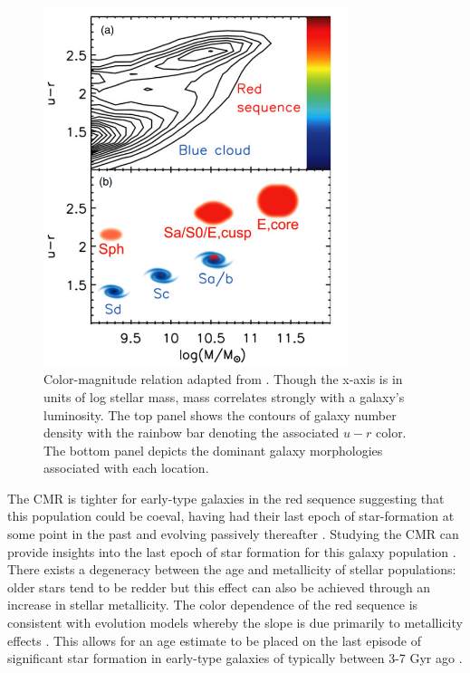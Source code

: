 \begin{figure}
\centering
\includegraphics[width=3.5in]{Figures/kormendy_CMR.png}
\caption[Galaxy color-magnitude relation.]{Color-magnitude relation adapted from \cite{Kormendy2012}. Though the x-axis is in units of log stellar mass, mass correlates strongly with a galaxy's luminosity. The top panel shows the contours of galaxy number density \citep{Baldry2004b} with the rainbow bar denoting the associated $u-r$ color. The bottom panel depicts the dominant galaxy morphologies associated with each location.}
\label{fig: CMR}
\end{figure}


The CMR is tighter for early-type galaxies in the red sequence suggesting that this population could be coeval, having had their last epoch of star-formation at some point in the past and evolving passively thereafter \citep{Bower1992}. Studying the CMR can provide insights into the last epoch of star formation for this galaxy population \citep{Sandage1978, Tully1982}. There exists a degeneracy between the age and metallicity of stellar populations: older stars tend to be redder but this effect can also be achieved through an increase in stellar metallicity. The color dependence of the red sequence is consistent with evolution models whereby the slope is due primarily to metallicity effects \citep{Bower1992, Kodama1997}. This allows for an age estimate to be placed on the last episode of significant star formation in early-type galaxies of typically between 3-7 Gyr ago \citep[e.g.,][]{LopezCruz2004}.%



